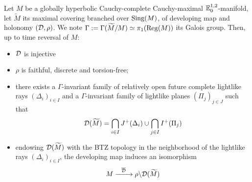 \begin{thm}\label{theo:globally_hyperbolic_cauchy_complete_cauchy_maximal} Let $M$ be a globally hyperbolic Cauchy-complete Cauchy-maximal ${\mathbb E}^{1,2}_{0}$-manifold, let $\widetilde M$ its maximal covering branched over $\mathrm{Sing}(M)$, of  developing map and holonomy  $(\mathcal{D},\rho)$. We note $\Gamma:=\Gamma(\widetilde M/M)\simeq\pi_1(\mathrm{Reg}(M))$ its Galois group.  Then, up to time reversal of $M$:
\begin{itemize}
 \item $\mathcal{D}$ is injective
 \item $\rho$ is faithful, discrete and torsion-free; 
 \item there exists a $\Gamma$-invariant family of relatively open future complete lightlike  rays $(\Delta_i)_{i\in I}$ and a $\Gamma$-invariant family of lightlike planes $(\Pi_j)_{j\in J}$ such that 
 $$\mathcal{D}(\widetilde M) = \bigcap_{i\in I} J^+(\Delta_i) \cup \bigcap_{j\in I} I^+(\Pi_j) $$
 
 \item endowing $\mathcal{D}(\widetilde M)$ with the BTZ topology in the neighborhood of the lightlike rays $(\Delta_i)_{i\in I}$, the developing map induces an isomorphism
 $$ M\xrightarrow{~~\overline {\mathcal{D}}~~} \rho\backslash\mathcal{D}(\widetilde M
 ) $$
\end{itemize}


\end{thm}
